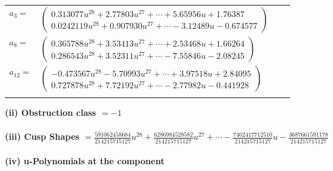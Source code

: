 \documentclass[1p]{elsarticle_modified}
\theoremstyle{definition}
\begin{document}
\begin{tabular}{m{7pt} m{180pt} m{7pt} m{180pt} }
\flushright $a_{3}=$&$\begin{pmatrix}0.313077 u^{28}+2.77803 u^{27}+\cdots+5.65956 u+1.76387\\0.0242119 u^{28}+0.907930 u^{27}+\cdots-3.12489 u-0.674577\end{pmatrix}$ \\
\flushright $a_{8}=$&$\begin{pmatrix}0.365788 u^{28}+3.53413 u^{27}+\cdots+2.53468 u+1.66264\\0.286543 u^{28}+3.52311 u^{27}+\cdots-7.55846 u-2.08245\end{pmatrix}$ \\
\flushright $a_{12}=$&$\begin{pmatrix}-0.473567 u^{28}-5.70993 u^{27}+\cdots+3.97518 u+2.84095\\0.727878 u^{28}+7.72192 u^{27}+\cdots-2.77982 u-0.441928\end{pmatrix}$\\&\end{tabular}
\flushleft \textbf{(ii) Obstruction class $= -1$}\\~\\
\flushleft \textbf{(iii) Cusp Shapes $= \frac{591062458684}{214215715127} u^{28}+\frac{6286984528582}{214215715127} u^{27}+\cdots-\frac{7402417712510}{214215715127} u-\frac{3687661591178}{214215715127}$}\\~\\
\newpage\renewcommand{\arraystretch}{1}
\flushleft \textbf{(iv) u-Polynomials at the component}\newline \\
\end{document}
